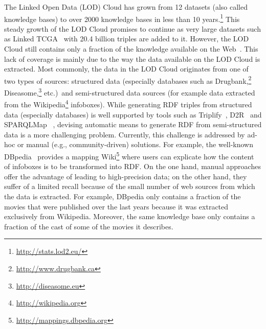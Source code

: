 \documentclass{llncs}
\begin{document}
The Linked Open Data (LOD) Cloud has grown from 12 datasets (also called knowledge bases) to over 2000 knowledge bases in less than 10 years.\footnote{\url{http://stats.lod2.eu/}}
This steady growth of the LOD Cloud promises to continue as very large datasets such as  Linked TCGA~\cite{SAL+13a} with 20.4 billion triples are added to it. However, the LOD Cloud still contains only a fraction of the knowledge available on the Web~\cite{GER+13}. This lack of coverage is mainly due to the way the data available on the LOD Cloud is extracted. Most commonly, the data in the LOD Cloud originates from one of two types of sources: structured data (especially databases such as Drugbank,\footnote{\url{http://www.drugbank.ca}} Diseasome,\footnote{\url{http://diseasome.eu}} etc.)~and semi-structured data sources (for example data extracted from the Wikipedia\footnote{\url{http://wikipedia.org}} infoboxes). While generating RDF triples from structured data (especially databases) is well supported by tools such as Triplify~\cite{DBLP:dblp_conf/www/AuerDLHA09}, D2R~\cite{Bizer04} and SPARQLMap~\cite{DBLP:conf/aswc/UnbehauenSA12}
, devising automatic means to generate RDF from semi-structured data is a more challenging  problem. 
Currently, this challenge is addressed by ad-hoc or manual (e.g., community-driven) solutions. 
For example, the well-known DBpedia~\cite{DBLP:conf/semweb/AuerBKLCI07} provides a mapping Wiki\footnote{\url{http://mappings.dbpedia.org}} where users can explicate how the content of infoboxes is to be transformed into RDF. On the one hand, manual approaches offer the advantage of leading to high-precision data; on the other hand, they suffer of a limited recall because of the small number of web sources from which the data is extracted. For example, DBpedia only contains a fraction of the movies that were published over the last years because it was extracted exclusively from Wikipedia.
Moreover, the same knowledge base only contains a fraction of the cast of some of the movies it describes.
\end{document}
